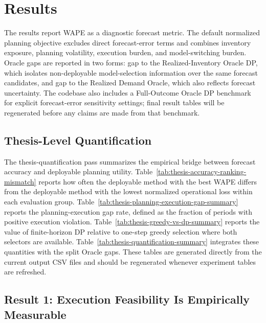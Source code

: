 \section{Results}

The results report WAPE as a diagnostic forecast metric. The default normalized planning objective excludes direct forecast-error terms and combines inventory exposure, planning volatility, execution burden, and model-switching burden. Oracle gaps are reported in two forms: gap to the Realized-Inventory Oracle DP, which isolates non-deployable model-selection information over the same forecast candidates, and gap to the Realized Demand Oracle, which also reflects forecast uncertainty. The codebase also includes a Full-Outcome Oracle DP benchmark for explicit forecast-error sensitivity settings; final result tables will be regenerated before any claims are made from that benchmark.

\subsection{Thesis-Level Quantification}

The thesis-quantification pass summarizes the empirical bridge between forecast accuracy and deployable planning utility. Table~\ref{tab:thesis-accuracy-ranking-mismatch} reports how often the deployable method with the best WAPE differs from the deployable method with the lowest normalized operational loss within each evaluation group. Table~\ref{tab:thesis-planning-execution-gap-summary} reports the planning-execution gap rate, defined as the fraction of periods with positive execution violation. Table~\ref{tab:thesis-greedy-vs-dp-summary} reports the value of finite-horizon DP relative to one-step greedy selection where both selectors are available. Table~\ref{tab:thesis-quantification-summary} integrates these quantities with the split Oracle gaps. These tables are generated directly from the current output CSV files and should be regenerated whenever experiment tables are refreshed.






\subsection{Result 1: Execution Feasibility Is Empirically Measurable}


